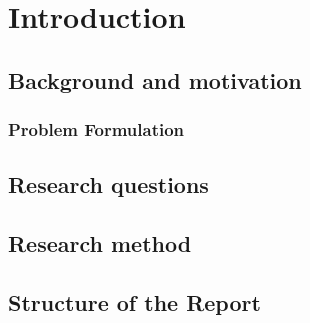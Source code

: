 \chapter{Introduction}
\label{ch:introduction}

\section{Background and motivation}




\subsection*{Problem Formulation}

\section{Research questions}

\section{Research method}
\section{Structure of the Report}


